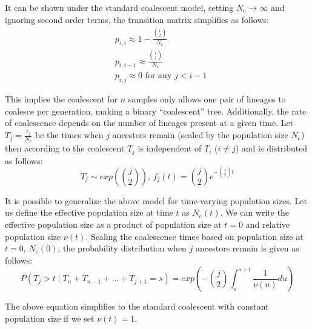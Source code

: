 It can be shown under the standard coalescent model, setting $N_e \rightarrow \infty$ and ignoring second order terms, the transition matrix simplifies as follows:
\begin{equation}
\begin{aligned}
    &p_{i,i} \approx 1 -  \frac{\binom{i}{2}}{N_e} \\
    &p_{i,i-1} \approx \frac{\binom{i}{2}}{N_e} \\
    &p_{i,j} \approx 0 \text{  for any  } j < i - 1
\end{aligned}
\end{equation}

This implies the coalescent for \(n\) samples only allows one pair of lineages to coalesce per generation, making a binary ``coalescent'' tree. Additionally, the rate of coalescence depends on the number of lineages present at a given time. Let $T_j = \frac{\tau_j}{N_e}$ be the times when $j$ ancestors remain (scaled by the population size $N_e$) then according to the coalescent $T_j$ is independent of $T_i$ ($i \neq j$) and is distributed as follows:
\begin{equation}
    T_j \sim exp \left( \binom{j}{2} \right)  \text{,   } f_j(t) =  \binom{j}{2}e^{- \binom{j}{2}t}
\end{equation}

It is possible to generalize the above model for time-varying population sizes. Let us define the effective population size at time $t$ as $N_e(t)$. We can write the effective population size as a product of population size at $t=0$ and relative population size $\nu(t)$. Scaling the coalescence times based on population size at $t=0$, $N_e(0)$, the probability distribution when $j$ ancestors remain is given as follows:
\begin{equation}
    P(T_j > t \mid T_n + T_{n-1} + ... + T_{j+1} = s) = exp\left( - \binom{j}{2} \int_{s}^{s+t} \frac{1}{\nu(u)} du  \right)
\label{eq:coal_general}
\end{equation}

The above equation simplifies to the standard coalescent with constant population size if we set $\nu(t) = 1$. 


